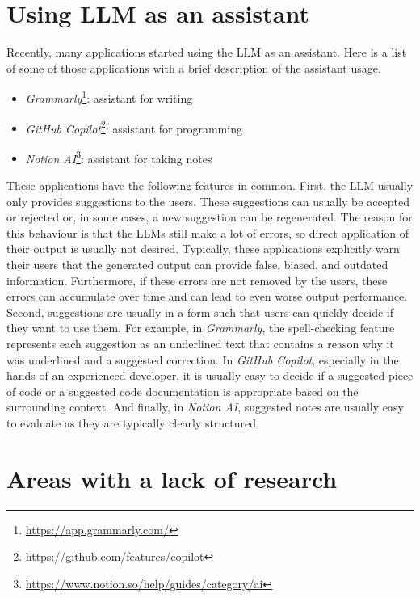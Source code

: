 \section*{Using LLM as an assistant}
\label{section:llm_as_an_assistant}

Recently, many applications started using the LLM as an assistant. Here is a list of some of those applications with a brief description of the assistant usage.

\begin{itemize}
\item \textit{Grammarly}\footnote{\url{https://app.grammarly.com/}}: assistant for writing
\item \textit{GitHub Copilot}\footnote{\url{https://github.com/features/copilot}}: assistant for programming
\item \textit{Notion AI}\footnote{\url{https://www.notion.so/help/guides/category/ai}}: assistant for taking notes
\end{itemize}

These applications have the following features in common. First, the LLM usually only provides suggestions to the users. These suggestions can usually be accepted or rejected or, in some cases, a new suggestion can be regenerated. The reason for this behaviour is that the LLMs still make a lot of errors, so direct application of their output is usually not desired. Typically, these applications explicitly warn their users that the generated output can provide false, biased, and outdated information. Furthermore, if these errors are not removed by the users, these errors can accumulate over time and can lead to even worse output performance. Second, suggestions are usually in a form such that users can quickly decide if they want to use them. For example, in \textit{Grammarly}, the spell-checking feature represents each suggestion as an underlined text that contains a reason why it was underlined and a suggested correction. In \textit{GitHub Copilot}, especially in the hands of an experienced developer, it is usually easy to decide if a suggested piece of code or a suggested code documentation is appropriate based on the surrounding context. And finally, in \textit{Notion AI}, suggested notes are usually easy to evaluate as they are typically clearly structured.


\section*{Areas with a lack of research}

